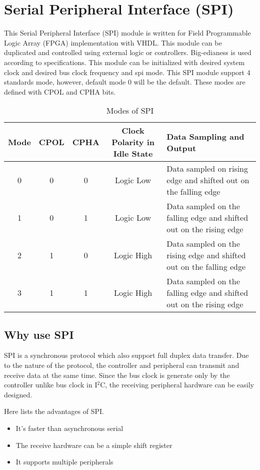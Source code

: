 \section{Serial Peripheral Interface (SPI)}
This Serial Peripheral Interface (SPI) module is written for Field Programmable Logic Array (FPGA) implementation with VHDL. This module can be duplicated and controlled using external logic or controllers. Big-edianess is used according to specifications. This module can be initialized with desired system clock and desired bus clock frequency and spi mode. This SPI module support 4 standards mode, however, default mode 0 will be the default. These modes are defined with CPOL and CPHA bits.



\begin{table}[!h]
	\centering
	\caption{Modes of SPI}
	\label{table:spimodes}
	\def\arraystretch{1.5}
	\begin{tabular}{|c|c|c|c|p{2.5in}|}
		\hline
		Mode & CPOL & CPHA & Clock Polarity in Idle State & Data Sampling and Output                                            \\
		\hline
		\hline
		0    & 0    & 0    & Logic Low                    & Data sampled on rising edge and shifted out on the falling edge     \\
		\hline
		1    & 0    & 1    & Logic Low                    & Data sampled on the falling edge and shifted out on the rising edge \\
		\hline
		2    & 1    & 0    & Logic High                   & Data sampled on the rising edge and shifted out on the falling edge \\
		\hline
		3    & 1    & 1    & Logic High                   & Data sampled on the falling edge and shifted out on the rising edge \\
		\hline
	\end{tabular}
\end{table}


\subsection{Why use SPI}
SPI is a synchronous protocol which also support full duplex data transfer. Due to the nature of the protocol, the controller and peripheral can transmit and receive data at the same time. Since the bus clock is generate only by the controller unlike bus clock in I$^2$C, the receiving peripheral hardware can be easily designed.

Here lists the advantages of SPI. \cite{whyspi}
\begin{itemize}
	\item It's faster than asynchronous serial
	\item The receive hardware can be a simple shift register
	\item It supports multiple peripherals
\end{itemize}

